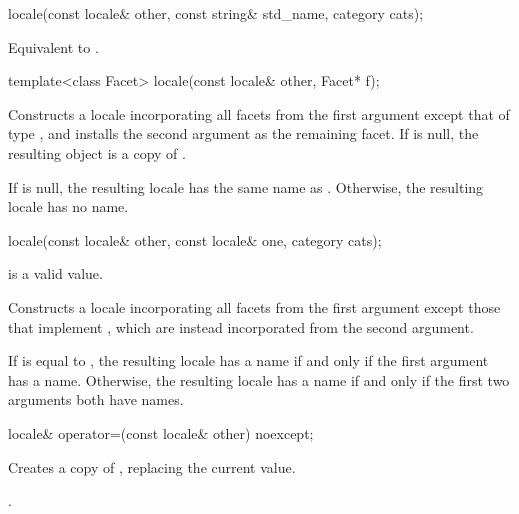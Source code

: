 %
\begin{itemdecl}
locale(const locale& other, const string& std_name, category cats);
\end{itemdecl}

\begin{itemdescr}
\pnum
\effects
Equivalent to .
\end{itemdescr}

%
\begin{itemdecl}
template<class Facet> locale(const locale& other, Facet* f);
\end{itemdecl}

\begin{itemdescr}
\pnum
\effects
Constructs a locale incorporating all facets from the first argument
except that of type ,
and installs the second argument as the remaining facet.
If  is null, the resulting object is a copy of .

\pnum
\remarks
If  is null,
the resulting locale has the same name as .
Otherwise, the resulting locale has no name.
\end{itemdescr}

%
\begin{itemdecl}
locale(const locale& other, const locale& one, category cats);
\end{itemdecl}

\begin{itemdescr}
\pnum
\expects
{} is a valid  value.

\pnum
\effects
Constructs a locale incorporating all facets from the first argument
except those that implement ,
which are instead incorporated from the second argument.

\pnum
\remarks
If  is equal to ,
the resulting locale has a name if and only if the first argument has a name.
Otherwise, the resulting locale has a name if and only if
the first two arguments both have names.
\end{itemdescr}

%
\begin{itemdecl}
locale& operator=(const locale& other) noexcept;
\end{itemdecl}

\begin{itemdescr}
\pnum
\effects
Creates a copy of , replacing the current value.

\pnum
\returns
{}.
\end{itemdescr}

